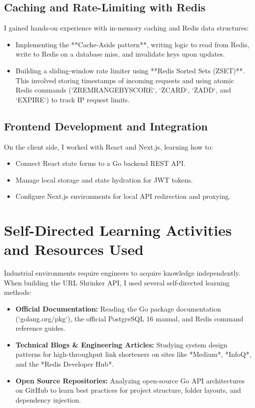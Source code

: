 \subsection{Caching and Rate-Limiting with Redis}
I gained hands-on experience with in-memory caching and Redis data structures:
\begin{itemize}
    \item Implementing the **Cache-Aside pattern**, writing logic to read from Redis, write to Redis on a database miss, and invalidate keys upon updates.
    \item Building a sliding-window rate limiter using **Redis Sorted Sets (ZSET)**. This involved storing timestamps of incoming requests and using atomic Redis commands (`ZREMRANGEBYSCORE`, `ZCARD`, `ZADD`, and `EXPIRE`) to track IP request limits.
\end{itemize}

\subsection{Frontend Development and Integration}
On the client side, I worked with React and Next.js, learning how to:
\begin{itemize}
    \item Connect React state forms to a Go backend REST API.
    \item Manage local storage and state hydration for JWT tokens.
    \item Configure Next.js environments for local API redirection and proxying.
\end{itemize}

\section{Self-Directed Learning Activities and Resources Used}
Industrial environments require engineers to acquire knowledge independently. When building the URL Shrinker API, I used several self-directed learning methods:
\begin{itemize}
    \item \textbf{Official Documentation:} Reading the Go package documentation (`golang.org/pkg`), the official PostgreSQL 16 manual, and Redis command reference guides.
    \item \textbf{Technical Blogs & Engineering Articles:} Studying system design patterns for high-throughput link shorteners on sites like *Medium*, *InfoQ*, and the *Redis Developer Hub*.
    \item \textbf{Open Source Repositories:} Analyzing open-source Go API architectures on GitHub to learn best practices for project structure, folder layouts, and dependency injection.
\end{itemize}

